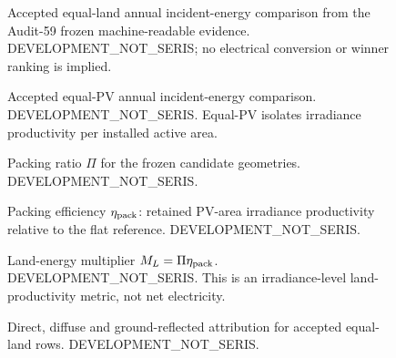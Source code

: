 \documentclass[11pt,a4paper]{article}
\begin{document}
\begin{figure}[htbp]\centering

\caption{Accepted equal-land annual incident-energy comparison from the Audit-59 frozen machine-readable evidence. DEVELOPMENT\_NOT\_SERIS; no electrical conversion or winner ranking is implied.}
\end{figure}
\begin{figure}[htbp]\centering

\caption{Accepted equal-PV annual incident-energy comparison. DEVELOPMENT\_NOT\_SERIS. Equal-PV isolates irradiance productivity per installed active area.}
\end{figure}
\begin{figure}[htbp]\centering

\caption{Packing ratio $\Pi$ for the frozen candidate geometries. DEVELOPMENT\_NOT\_SERIS.}
\end{figure}
\begin{figure}[htbp]\centering

\caption{Packing efficiency $\eta_{\rm pack}$: retained PV-area irradiance productivity relative to the flat reference. DEVELOPMENT\_NOT\_SERIS.}
\end{figure}
\begin{figure}[htbp]\centering

\caption{Land-energy multiplier $M_L=\Pi\eta_{\rm pack}$. DEVELOPMENT\_NOT\_SERIS. This is an irradiance-level land-productivity metric, not net electricity.}
\end{figure}
\begin{figure}[htbp]\centering

\caption{Direct, diffuse and ground-reflected attribution for accepted equal-land rows. DEVELOPMENT\_NOT\_SERIS.}
\end{figure}

\begin{table}[htbp]\centering
\caption{Main controlled-comparison publication table generated from Audit-59 accepted rows. Areas are m$^2$; annual component and total values are Wh. All rows are DEVELOPMENT\_NOT\_SERIS and use refined 4-by-24 mesh / sky-16 evidence.}
\resizebox{\textwidth}{!}{}
\end{table}
\end{document}
